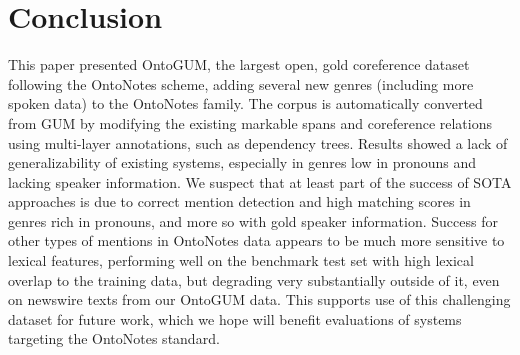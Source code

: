 \documentclass[11pt,a4paper]{article}
\begin{document}
\section{Conclusion}

This paper presented OntoGUM, the largest open, gold coreference dataset following the OntoNotes scheme, adding several new genres (including more spoken data) to the OntoNotes family. The corpus is automatically converted from GUM by modifying the existing markable spans and coreference relations using multi-layer annotations, such as dependency trees. Results showed a lack of generalizability of existing systems, especially in genres low in pronouns and lacking speaker information. We suspect that at least part of the success of SOTA approaches is due to correct mention detection and high matching scores in genres rich in pronouns, and more so with gold speaker information. Success for other types of mentions in OntoNotes data appears to be much more sensitive to lexical features, performing well on the benchmark test set with high lexical overlap to the training data, but degrading very substantially outside of it, even on newswire texts from our OntoGUM data. This supports use of this challenging dataset for future work, which we hope will benefit evaluations of systems targeting the OntoNotes standard. 




\end{document}

